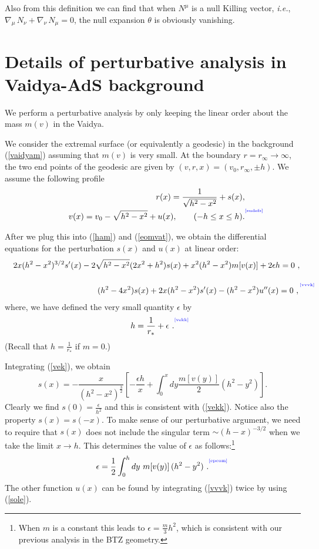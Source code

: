 \documentclass[12pt]{article}
\newcommand{\be}{\begin{equation}}
\newcommand{\ee}{\end{equation}}
\def\req#1{(\ref{#1})}
\def\ie{{\it i.e.}}
\def\s{\sigma}
\def\f#1#2{{\frac{#1}{#2}}}
\def\f#1#2{{\frac{#1}{#2}}}
\def\Label#1{\label{#1}%
{ \color{blue}{\smash{\hbox to0pt{\raise2ex\hbox{\tiny[#1]}\hss}}}}}
\def\s{\sqrt}
\def\f {\frac}
\def\no{\nonumber \\}
\def\ep{\epsilon}
\def\ba{\begin{eqnarray}}
\def\ea{\end{eqnarray}}
\begin{document}
Also from this definition we can find that when  $N^\mu$ is a null
Killing vector,
\ie, $\nabla_{\! \mu} \, N_\nu + \nabla_{\! \nu} \, N_\mu = 0$,
the null expansion $\theta$ is obviously vanishing.


\section{Details of perturbative analysis in Vaidya-AdS background}
\label{apvaidya}

We perform a perturbative analysis by only keeping the linear order
about the mass $m(v)$ in the Vaidya.

We consider the extremal surface (or equivalently a geodesic) in the
background \req{vaidyam} assuming that $m(v)$ is very small. At the
boundary $r=r_{\infty}\to \infty$, the two end points of the
geodesic are given by $(v,r,x)=(v_0,r_{\infty},\pm h)$. We assume
the following profile
%
 \ba && r(x)=\f{1}{\s{h^2-x^2}}+s(x), \no &&
v(x)=v_0-\s{h^2-x^2}+u(x),\ \ \ \ \ \ (-h\leq x\leq h) .
\Label{sudefs}
\ea
%

After we plug this into (\ref{ham}) and (\ref{eomvat}), we obtain
the differential equations for the perturbation $s(x)$ and $u(x)$ at
linear order:
%
\ba &&
2x(h^2-x^2)^{3/2}s'(x)-2\s{h^2-x^2}(2x^2+h^2)s(x)+x^2(h^2-x^2)m[v(x)]
+2\ep h=0 \ , \no  \label{vek} \\ &&
(h^2-4x^2)s(x)+2x(h^2-x^2)s'(x)-(h^2-x^2)u''(x)=0 \ ,  \Label{vvvk} \ea
%
where, we have defined the very small quantity $\ep$ by
%
\be h=\f{1}{r_*}+\ep\ . \Label{vekk} \ee
%
 (Recall that
$h=\f{1}{r_*}$ if $m=0$.)

Integrating (\ref{vek}), we obtain
%
 \be
s(x)=-\f{x}{(h^2-x^2)^\f{3}{2}}\left[-\f{\ep h}{x}+\int^x_0
dy\f{m[v(y)]}{2}(h^2-y^2)\right]. \label{sole} \ee
%
Clearly we find $s(0)=\f{\ep}{h^2}$ and this is consistent with \req{vekk}. Notice
also the property $s(x)=s(-x)$. To make sense of our perturbative
argument, we need to require that $s(x)$ does not include the
singular term $\sim (h-x)^{-3/2}$ when we take the limit $x\to h$.
This determines the value of $\ep$ as follows:\footnote{When $m$ is a
constant this leads to $\ep=\f{m}{3}h^2$, which is consistent with
our previous analysis in the BTZ geometry.}
%
\be \ep=\f{1}{2}\int^h_0 dy~
m[v(y)]\, (h^2-y^2)\ . \Label{epcom} \ee
%
The other function $u(x)$ can be found by integrating \req{vvvk}
twice by using \req{sole}.
\end{document}
